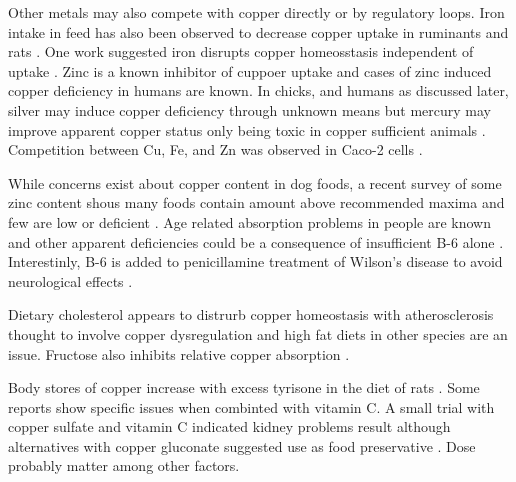 {Other metals may also compete with copper directly or
by regulatory loops.
Iron intake in feed has also been observed to decrease
copper uptake in ruminants 
\cite{Clarkson_Paine_Kendall_Evaluation_solubility_2021} 
and rats
\cite{Lee_Ha_Collins_Dietary_Iron_Intake_2021}
.
One work suggested  iron disrupts copper homeosstasis
independent of uptake
\cite{Ha_Doguer_Collins_Consumption_high_2017}.
Zinc is a known inhibitor of cuppoer uptake
and cases of zinc induced copper deficiency in humans
are known\cite{PMC7495772}.
In chicks, and humans as discussed later, silver may induce
copper deficiency through unknown means but mercury
may improve apparent copper status only being toxic 
in copper sufficient animals
\cite{Hill_Starcher_Matrone_Mercury_Silver_Interrelationships_1964}.
Competition between Cu, Fe, and Zn was observed in Caco-2
cells \cite{ARREDONDO_MARTINEZ_NUNEZ_Inhibition_iron_2006}.

While concerns exist about copper content in dog foods, a
recent survey of some zinc content shous many foods 
contain amount above recommended maxima and few are
low or deficient \cite{PMC8066201}.
Age related absorption problems in people
are known \cite{PMC5133110} and other apparent deficiencies 
could be a consequence of
insufficient B-6 alone \cite{PMID7814236}.
Interestinly, B-6 is added to penicillamine treatment of
Wilson's disease to avoid neurological effects
\cite{PMC3526418}.

Dietary cholesterol appears to distrurb copper homeostasis 
with atherosclerosis thought to involve copper dysregulation
\cite{PMID33661473}
and high fat diets in other species \cite{PMC5167165} are an issue.
Fructose also inhibits relative copper absorption
\cite{ODell_Fructose_mineral_metabolism_1993}
\cite{PMID7825519}.



Body stores of copper increase with excess tyrisone in the diet
of rats
\cite{Yang_Noda_Kato_Elevated_Intestinal_Absorption_}.
Some reports show specific issues when combinted with vitamin C.
A small trial with copper sulfate and vitamin C indicated kidney problems
result 
\cite{Jiang_Sui_Hong_Combined_Administration_2023}
although alternatives with copper gluconate 
suggested use as food preservative
\cite{Graf_Copper_Ascorbate_1994}
. Dose probably matter among other factors.  

} %


